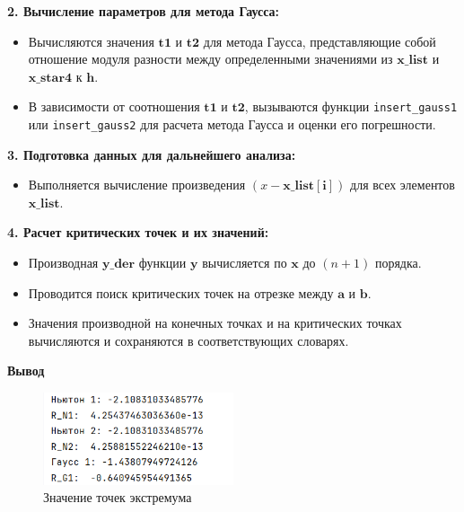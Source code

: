 \documentclass{article}
\begin{document}
\textbf{2. Вычисление параметров для метода Гаусса:}
\begin{itemize}
    \item Вычисляются значения $ \mathbf{t1} $ и $ \mathbf{t2} $ для метода Гаусса, представляющие собой отношение модуля разности между определенными значениями из $ \mathbf{x\_list} $ и $ \mathbf{x\_star4} $ к $ \mathbf{h} $.
    \item В зависимости от соотношения $ \mathbf{t1} $ и $ \mathbf{t2} $, вызываются функции \texttt{insert\_gauss1} или \texttt{insert\_gauss2} для расчета метода Гаусса и оценки его погрешности.
\end{itemize}

\textbf{3. Подготовка данных для дальнейшего анализа:}
\begin{itemize}
    \item Выполняется вычисление произведения $ (x - \mathbf{x\_list[i]}) $ для всех элементов $ \mathbf{x\_list} $.
\end{itemize}

\textbf{4. Расчет критических точек и их значений:}
\begin{itemize}
    \item Производная $ \mathbf{y\_der} $ функции $ \mathbf{y} $ вычисляется по $ \mathbf{x} $ до $ (n + 1) $ порядка.
    \item Проводится поиск критических точек на отрезке между $ \mathbf{a} $ и $ \mathbf{b} $.
    \item Значения производной на конечных точках и на критических точках вычисляются и сохраняются в соответствующих словарях.
\end{itemize}
\textbf{Вывод}

\begin{figure}[h]
    \centering
    \includegraphics[width=0.5\textwidth]{lab_2_2.png}
    \caption{Значение точек экстремума}
    \label{fig:my_label}
\end{figure}
\end{document}
